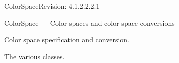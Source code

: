 %
%
% 
% 
% 
% 
%

\begin{manpage}{\libtitle}{ColorSpace}{$ $Revision: 4.1.2.2.2.1 $ $}

\subtitle{Name}
    ColorSpace --- Color spaces and color space conversions


\subtitle{Description}
    Color space specification and conversion.


\subtitle{Declaration}


\subtitle{See Also}
    The various  classes.


\subtitle{Revision}

\end{manpage}
